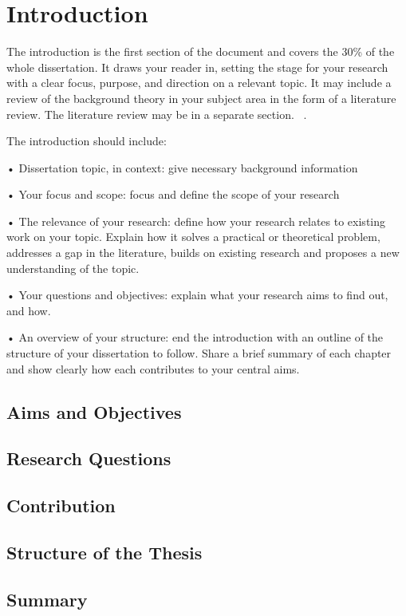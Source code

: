 \chapter {Introduction}
\label{label}


The introduction is the first section of the document and covers the 30\% of the whole dissertation. It draws your reader in, setting the stage for your research with a clear focus, purpose, and direction on a relevant topic.
It may include a review of the background theory in your subject area in the form of a literature review. The literature review may be in a separate section. ~\cite{BernersLee2010}. ~\cite{Abdullah2017, Abidi2017, Angelov2019, Auxier2021, Bauman2004, Bramer2007, Ek2018}

The introduction should include:

•	Dissertation topic, in context: give necessary background information

•	Your focus and scope: focus and define the scope of your research

•	The relevance of your research: define how your research relates to existing work on your topic. Explain how it solves a practical or theoretical problem, addresses a gap in the literature, builds on existing research and proposes a new understanding of the topic. 

•	Your questions and objectives: explain what your research aims to find out, and how.

•	An overview of your structure: end the introduction with an outline of the structure of your dissertation to follow. Share a brief summary of each chapter and show clearly how each contributes to your central aims.  


\section{Aims and Objectives}
\label{label1}


\section{Research Questions}
\label{label2}


\section{Contribution}
\label{label3}


\section{Structure of the Thesis}
\label{label4}


\section{Summary}
\label{label5}